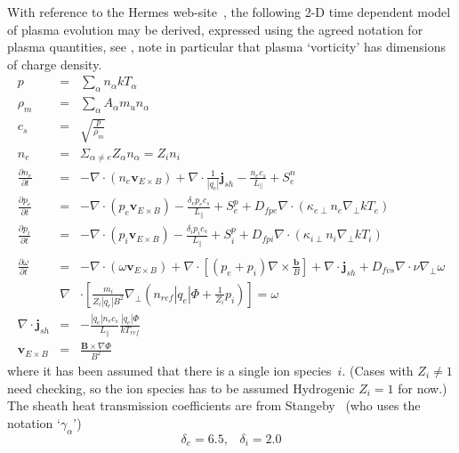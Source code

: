 With reference to the Hermes web-site~\cite{hermes3website}, the following 2-D time dependent
model of plasma evolution may be derived, expressed using the agreed notation
for plasma quantities, see ,
note in particular that plasma `vorticity' has dimensions of charge density. 
\begin{eqnarray}
p &=& \sum_\alpha n_\alpha kT_\alpha \\
\rho_m &=& \sum_\alpha A_\alpha m_u n_\alpha \\
c_s &=& \sqrt{\frac{p}{\rho_m}} \\ 
n_{e} &=& \Sigma_{\alpha\neq e} Z_\alpha n_\alpha = Z_i n_i\\
\frac{\partial n_e}{\partial t} &=& - \nabla\cdot\left(n_e\mathbf{v}_{E\times 
B}\right) + \nabla\cdot{\frac{1}{|q_e|}\mathbf{j}_{sh}} - \frac{n_e c_s}{L_\|}  + S^n_e \\ 
\frac{\partial p_e}{\partial t} &=& - \nabla\cdot\left(p_e\mathbf{v}_{E\times 
B}\right) - \frac{\delta_e p_e c_s}{L_\|} + S^p_e
+D_{fpe}\nabla \cdot \left( {\kappa_{e\perp}} n_e \nabla_\perp kT_e \right) \\
\frac{\partial p_{i}}{\partial t} &=& - \nabla\cdot\left(p_{i}\mathbf{v}_{E\times B}\right) 
- \frac{\delta_i p_{i} c_s}{L_\|} + S^p_i
+D_{fpi}\nabla \cdot \left( {\kappa_{i\perp}} n_i \nabla_\perp kT_i \right) \\
\\
\frac{\partial \omega}{\partial t} &=& 
-\nabla\cdot\left(\omega\mathbf{v}_{E\times B}\right) + \nabla\cdot\left[\left(p_e + 
p_i\right)\nabla\times\frac{\mathbf{b}}{B}\right] + \nabla\cdot\mathbf{j}_{sh}
+ D_{fvs}\nabla \cdot \nu \nabla_\perp \omega
\\ 
& \nabla & \cdot  \left[\frac{m_i}{Z_i |q_e|B^2}\nabla_\perp\left(n_{ref} |q_e|\Phi + \frac{1}{Z_i } p_i \right)\right] = \omega \\
\nabla\cdot\mathbf{j}_{sh} &=& -\frac{|q_e|n_ec_s}{L_{\|}}  \frac{|q_e|\Phi}{kT_{ref}} \\
\mathbf{v}_{E\times B} &=&  \frac{\mathbf{B}\times \nabla \Phi}{B^2}
\end{eqnarray}
where it has been assumed that there is a single ion species~$i$.
(Cases with $Z_i\neq 1$ need checking, so the ion species has to be assumed Hydrogenic $Z_i=1$ for now.)
The sheath heat transmission coefficients are from Stangeby~\cite[\S\,2.8]{stangeby} (who uses
the notation `$\gamma_\alpha$')
\begin{equation}\label{eq:shtc}
\delta_e=6.5,\;\;\;\delta_i=2.0
\end{equation}

